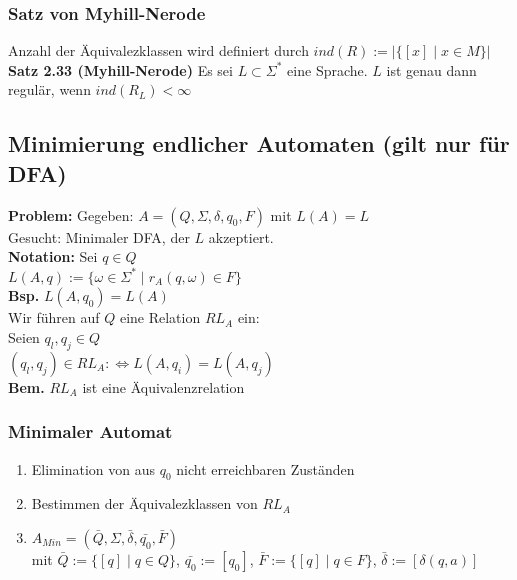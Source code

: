 \documentclass[a4paper,10pt,landscape,twocolumn]{article}
\newcommand{\Bold}[1]{\textbf{#1}} %
\newcommand{\Lra}{\Leftrightarrow}
\begin{document}
\subsubsection{Satz von Myhill-Nerode}
Anzahl der \"Aquivalezklassen wird definiert durch $ind(R):=|\{[x]\mid x\in M\}|$\\
\Bold{Satz 2.33 (Myhill-Nerode)} Es sei $L\subset \Sigma^*$ eine Sprache. $L$ ist genau dann regul\"ar, wenn $ind(R_L)<\infty$
\subsection{Minimierung endlicher Automaten (gilt nur f\"ur DFA)}
\Bold{Problem:} Gegeben: $A=(Q,\Sigma,\delta,q_0,F)$ mit $L(A)=L$\\
Gesucht: Minimaler DFA, der $L$ akzeptiert.\\
\Bold{Notation:} Sei $q\in Q$\\
$L(A,q):=\{\omega\in\Sigma^*\mid r_A(q,\omega)\in F\}$\\
\Bold{Bsp.} $L(A,q_0)=L(A)$\\
Wir f\"uhren auf $Q$ eine Relation $RL_A$ ein:\\
Seien $q_l,q_j\in Q$\\
$(q_l,q_j)\in RL_A:\Lra L(A,q_i)=L(A,q_j)$\\
\Bold{Bem.} $RL_A$ ist eine \"Aquivalenzrelation
\subsubsection{Minimaler Automat}
\begin{enumerate}
 \item Elimination von aus $q_0$ nicht erreichbaren Zust\"anden
 \item Bestimmen der \"Aquivalezklassen von $RL_A$
 \item $A_{Min}=(\bar{Q},\Sigma,\bar{\delta},\bar{q_0},\bar{F})$\\
 mit $\bar{Q}:=\{[q]\mid q\in Q\}$, $\bar{q_0}:=[q_0]$, $\bar{F}:=\{[q]\mid q\in F\}$, $\bar{\delta}:=[\delta(q,a)]$
\end{enumerate}
\end{document}
